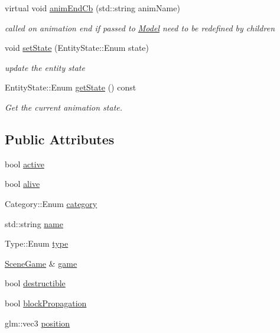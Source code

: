 \begin{DoxyCompactItemize}
virtual void \hyperlink{class_a_entity_ac1fd0bdb4c01a4767660f03cd06cd2ac}{anim\+End\+Cb} (std\+::string anim\+Name)
\begin{DoxyCompactList}\small\item\em called on animation end if passed to \hyperlink{class_model}{Model} need to be redefined by children \end{DoxyCompactList}\item 
void \hyperlink{class_a_entity_ae68a6ff3f5770215116b6ab99d098ed0}{set\+State} (Entity\+State\+::\+Enum state)
\begin{DoxyCompactList}\small\item\em update the entity state \end{DoxyCompactList}\item 
Entity\+State\+::\+Enum \hyperlink{class_a_entity_a135cbfb08a2204ff396de4de2d645b5f}{get\+State} () const
\begin{DoxyCompactList}\small\item\em Get the current animation state. \end{DoxyCompactList}\end{DoxyCompactItemize}
\subsection*{Public Attributes}
\begin{DoxyCompactItemize}
\item 
bool \hyperlink{class_a_entity_a38851d630b58ed997d6c47bc7f2ee58c}{active}
\item 
bool \hyperlink{class_a_entity_a668a6a3428c53d0fd2936a5d59ef52ef}{alive}
\item 
Category\+::\+Enum \hyperlink{class_a_entity_abc6c4a36aeafe9d30a435fbdac516347}{category}
\item 
std\+::string \hyperlink{class_a_entity_a9ebdf8322a0017ff6063f180ef9f037a}{name}
\item 
Type\+::\+Enum \hyperlink{class_a_entity_a4cddb4c9fbae86691e73940edc3731c3}{type}
\item 
\hyperlink{class_scene_game}{Scene\+Game} \& \hyperlink{class_a_entity_aa2c05db944a8b7487eb8470dd20211ab}{game}
\item 
bool \hyperlink{class_a_entity_a09a8ea3c31791230fb95f8c52a12d0b3}{destructible}
\item 
bool \hyperlink{class_a_entity_a0fc8661a7cb58534524e5671e78e7ba1}{block\+Propagation}
\item 
glm\+::vec3 \hyperlink{class_a_entity_acc4f7ad8936089f64c706aa15e86bcea}{position}
\end{DoxyCompactItemize}
